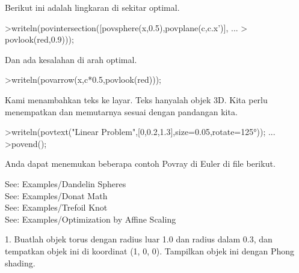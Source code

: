 \documentclass{article}
\begin{document}
\begin{eulernotebook}
\begin{eulercomment}
\begin{eulercomment}
\begin{eulercomment}
\begin{eulercomment}
\begin{eulercomment}
\begin{eulercomment}
\begin{eulercomment}
\begin{eulercomment}
\begin{eulercomment}
\begin{eulercomment}
\begin{eulercomment}
\begin{eulercomment}
\begin{eulercomment}
\begin{eulercomment}
\begin{eulercomment}
\begin{eulercomment}
\begin{eulercomment}
\begin{eulercomment}
\begin{eulercomment}
\begin{eulercomment}
\begin{eulercomment}
\begin{eulercomment}
\begin{eulercomment}
\begin{eulercomment}
\begin{eulercomment}
\begin{eulercomment}
\begin{eulercomment}
\begin{eulercomment}
\begin{eulercomment}
\begin{eulercomment}
\begin{eulercomment}
Berikut ini adalah lingkaran di sekitar optimal.
\end{eulercomment}
\begin{eulerprompt}
>writeln(povintersection([povsphere(x,0.5),povplane(c,c.x')], ...
>  povlook(red,0.9)));
\end{eulerprompt}
\begin{eulercomment}
Dan ada kesalahan di arah optimal.
\end{eulercomment}
\begin{eulerprompt}
>writeln(povarrow(x,c*0.5,povlook(red)));
\end{eulerprompt}
\begin{eulercomment}
Kami menambahkan teks ke layar. Teks hanyalah objek 3D. Kita perlu
menempatkan dan memutarnya sesuai dengan pandangan kita.
\end{eulercomment}
\begin{eulerprompt}
>writeln(povtext("Linear Problem",[0,0.2,1.3],size=0.05,rotate=125°)); ...
>povend();
\end{eulerprompt}
\begin{eulercomment}
Anda dapat menemukan beberapa contoh Povray di Euler di file berikut.

See: Examples/Dandelin Spheres\\
See: Examples/Donat Math\\
See: Examples/Trefoil Knot\\
See: Examples/Optimization by Affine Scaling
\end{eulercomment}
\begin{eulercomment}
1. Buatlah objek torus dengan radius luar 1.0 dan radius dalam 0.3,
dan tempatkan objek ini di koordinat (1, 0, 0). Tampilkan objek ini
dengan Phong shading.


\end{eulercomment}
\end{eulercomment}
\end{eulercomment}
\end{eulercomment}
\end{eulercomment}
\end{eulercomment}
\end{eulercomment}
\end{eulercomment}
\end{eulercomment}
\end{eulercomment}
\end{eulercomment}
\end{eulercomment}
\end{eulercomment}
\end{eulercomment}
\end{eulercomment}
\end{eulercomment}
\end{eulercomment}
\end{eulercomment}
\end{eulercomment}
\end{eulercomment}
\end{eulercomment}
\end{eulercomment}
\end{eulercomment}
\end{eulercomment}
\end{eulercomment}
\end{eulercomment}
\end{eulercomment}
\end{eulercomment}
\end{eulercomment}
\end{eulercomment}
\end{eulercomment}
\end{eulernotebook}
\end{document}
